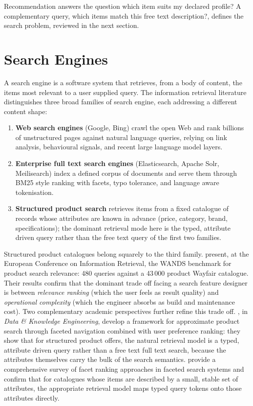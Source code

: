Recommendation answers the question \guillemotleft{}which item suits my declared profile?\guillemotright{} A complementary query, \guillemotleft{}which items match this free text description?\guillemotright{}, defines the search problem, reviewed in the next section.

\section{Search Engines}

A search engine is a software system that retrieves, from a body of content, the items most relevant to a user supplied query. The information retrieval literature distinguishes three broad families of search engine, each addressing a different content shape:

\begin{enumerate}
  \item \textbf{Web search engines} (Google, Bing) crawl the open Web and rank billions of unstructured pages against natural language queries, relying on link analysis, behavioural signals, and recent large language model layers.
  \item \textbf{Enterprise full text search engines} (Elasticsearch, Apache Solr, Meilisearch) index a defined corpus of documents and serve them through BM25 style ranking with facets, typo tolerance, and language aware tokenisation.
  \item \textbf{Structured product search} retrieves items from a fixed catalogue of records whose attributes are known in advance (price, category, brand, specifications); the dominant retrieval mode here is the typed, attribute driven query rather than the free text query of the first two families.
\end{enumerate}

Structured product catalogues belong squarely to the third family. \textcite{ChenWANDS2022} present, at the European Conference on Information Retrieval, the WANDS benchmark for product search relevance: 480 queries against a 43\,000 product Wayfair catalogue. Their results confirm that the dominant trade off facing a search feature designer is between \emph{relevance ranking} (which the user feels as result quality) and \emph{operational complexity} (which the engineer absorbs as build and maintenance cost). Two complementary academic perspectives further refine this trade off. \textcite{Vandic2024Faceted}, in \textit{Data \& Knowledge Engineering}, develop a framework for approximate product search through faceted navigation combined with user preference ranking: they show that for structured product offers, the natural retrieval model is a typed, attribute driven query rather than a free text full text search, because the attributes themselves carry the bulk of the search semantics. \textcite{AliCaputo2023Facet} provide a comprehensive survey of facet ranking approaches in faceted search systems and confirm that for catalogues whose items are described by a small, stable set of attributes, the appropriate retrieval model maps typed query tokens onto those attributes directly.

